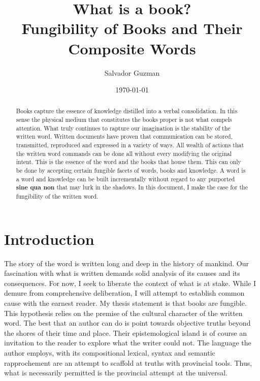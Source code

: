 \documentclass[12pt]{article}
\begin{document}
\title{What is a book?\\
\large Fungibility of Books and Their Composite Words}
\newpage 

\author{Salvador Guzman}
\date{\today}
\newpage

\maketitle
\newpage

\begin{abstract}
Books capture the essence of knowledge distilled into a verbal consolidation. In
this sense the physical medium that constitutes the books proper is not what
compels attention. What truly continues to rapture our imagination is the
stability of the written word. Written documents have proven that communication
can be stored, transmitted, reproduced and expressed in a variety of ways. All
wealth of actions that the written word commands can be done all without every
modifying the original intent. This is the essence of the word and the
books that house them. This can only be done by accepting certain fungible
facets of words, books and knowledge. A word is a word and knowledge can be
built incrementally without regard to any purported \textbf{sine qua non} that may
lurk in the shadows. In this document, I make the case for the fungibility of
the written word.
\end{abstract}

\newpage

\tableofcontents
\newpage

\section{Introduction}
The story of the word is written long and deep in the history of mankind. Our
fascination with what is written demands solid analysis of its causes and its
consequences. For now, I seek to liberate the context of what is at stake. While I
demure from comprehensive deliberation, I will attempt to establish common cause
with the earnest reader. My thesis statement is that books are fungible. This
hypothesis relies on the premise of the cultural character of the written word.
The best that an author can do is point towards objective truths beyond 
the shores of their time and place. Their epistemological island is of course an
invitation to the reader to explore what the writer could not. The language the
author employs, with its compositional lexical, syntax and semantic
rapprochement are an attempt to scaffold at truths with provincial tools. Thus,
what is necessarily permitted is the provincial attempt at the universal.
\end{document}
